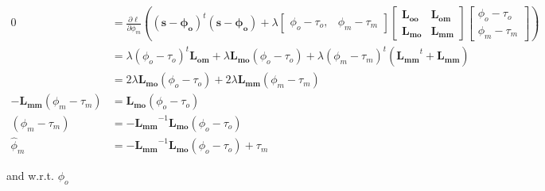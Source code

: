 \documentclass{article}
\begin{document}
        \begin{align}
            0 &= \frac{\partial\ell}{\partial\phi_m}\left((\mathbf{s} - \mathbf{\phi_o})^t(\mathbf{s} - \mathbf{\phi_o}) + \lambda
                \begin{bmatrix}
                    \phi_o - \tau_o, & \phi_m - \tau_m
                \end{bmatrix}
                \begin{bmatrix}
                    \mathbf{L_{oo}} & \mathbf{L_{om}} \\ \mathbf{L_{mo}} & \mathbf{L_{mm}}
                \end{bmatrix}
                \begin{bmatrix}
                    \phi_o - \tau_o \\ \phi_m - \tau_m
                \end{bmatrix}\right)\\
            &= \lambda(\phi_o - \tau_o)^t\mathbf{L_{om}} + \lambda\mathbf{L_{mo}}(\phi_o - \tau_o)
                 + \lambda(\phi_m - \tau_m)^t(\mathbf{L_{mm}}^t+ \mathbf{L_{mm}}) \nonumber\\
            &= 2\lambda\mathbf{L_{mo}}(\phi_o - \tau_o) + 2\lambda\mathbf{L_{mm}}(
                \phi_m - \tau_m) \nonumber\\
            -\mathbf{L_{mm}}(\phi_m - \tau_m) &= \mathbf{L_{mo}}(\phi_o - \tau_o) \nonumber\\
            (\phi_m - \tau_m) &= -\mathbf{L_{mm}}^{-1}\mathbf{L_{mo}}(\phi_o - \tau_o) \nonumber\\
            {\hat \phi_m} &= -\mathbf{L_{mm}}^{-1}\mathbf{L_{mo}}(\phi_o - \tau_o) + \tau_m
            \label{eqn:estimate_of_phi_m_complete}
        \end{align}

        \noindent and w.r.t. $\phi_o$
\end{document}
